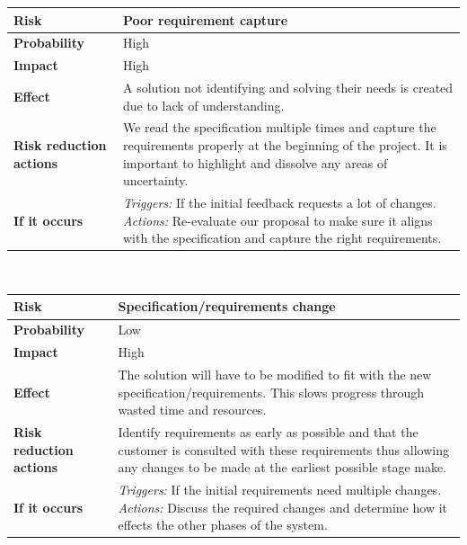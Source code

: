 \noindent
\begin{tabular}{|l || p{10.3cm}|}
\hline
\textbf{Risk} & Poor requirement capture \\ \hline
\textbf{Probability} & High \\ \hline
\textbf{Impact} & High \\ \hline
\textbf{Effect} & A solution not identifying and solving their needs is created due to lack of understanding. \\ \hline
\textbf{Risk reduction actions} & We read the specification multiple times and capture the requirements properly at the beginning of the project.  It is important to highlight and dissolve any areas of uncertainty. \\ \hline
\textbf{If it occurs} & \emph{Triggers:} If the initial feedback requests a lot of changes. \emph{Actions:} Re-evaluate our proposal to make sure it aligns with the specification and capture the right requirements.\\ 
\hline
\end{tabular}\\
\vspace{0.5cm}

\noindent
\begin{tabular}{|l || p{10.3cm}|}
\hline
\textbf{Risk} & Specification/requirements change\\ \hline
\textbf{Probability} & Low \\ \hline
\textbf{Impact} & High \\ \hline
\textbf{Effect} & The solution will have to be modified to fit with the new specification/requirements.  This slows progress through wasted time and resources.   \\ \hline
\textbf{Risk reduction actions} & Identify requirements as early as possible and that the customer is consulted with these requirements thus allowing any changes to be made at the earliest possible stage make. \\ \hline
\textbf{If it occurs} & \emph{Triggers:} If the initial requirements need multiple changes. \emph{Actions:} Discuss the required changes and determine how it effects the other phases of the system.\\ 
\hline
\end{tabular}\\
\vspace{0.5cm}

